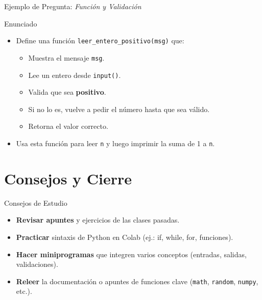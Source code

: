 \documentclass[10pt]{beamer}
\begin{document}
\begin{frame}[fragile]{Ejemplo de Pregunta: \textit{Función y Validación}}
  \begin{block}{Enunciado}
    \begin{itemize}
      \item Define una función \texttt{leer\_entero\_positivo(msg)} que:
        \begin{itemize}
          \item Muestra el mensaje \texttt{msg}.
          \item Lee un entero desde \texttt{input()}.
          \item Valida que sea \textbf{positivo}.
          \item Si no lo es, vuelve a pedir el número hasta que sea válido.
          \item Retorna el valor correcto.
        \end{itemize}
      \item Usa esta función para leer \texttt{n} y luego imprimir la suma de 1 a \texttt{n}.
    \end{itemize}
  \end{block}
\end{frame}

\section{Consejos y Cierre}

\begin{frame}{Consejos de Estudio}
  \begin{itemize}
    \item \textbf{Revisar apuntes} y ejercicios de las clases pasadas.
    \item \textbf{Practicar} sintaxis de Python en Colab (ej.: if, while, for, funciones).
    \item \textbf{Hacer miniprogramas} que integren varios conceptos (entradas, salidas, validaciones).
    \item \textbf{Releer} la documentación o apuntes de funciones clave (\texttt{math}, \texttt{random}, \texttt{numpy}, etc.).
  \end{itemize}
\end{frame}
\end{document}
